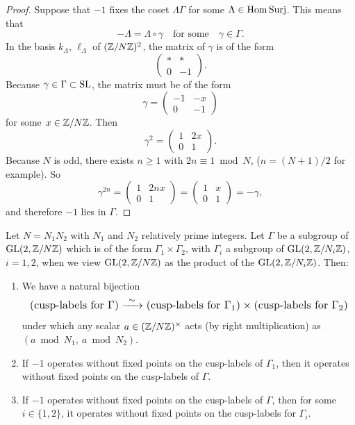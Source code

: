 \begin{proof}
Suppose that $-1$ fixes the coset $\Lambda\Gamma$ for some $\Lambda \in \mathrm{Hom\,Surj}$. This means that
\[
-\Lambda = \Lambda \circ \gamma \quad\text{for some}\quad \gamma \in \Gamma .
\]
In the basis $k_\Lambda$, $\ell_\Lambda$ of $(\mathbb{Z}/N\mathbb{Z})^2$, the matrix of $\gamma$ is of the form
\[
\begin{pmatrix} * & * \\ 0 & -1 \end{pmatrix} .
\]
Because $\gamma \in \Gamma \subset \operatorname{SL}$, the matrix must be of the form
\[
\gamma = \begin{pmatrix} -1 & -x \\ 0 & -1 \end{pmatrix}
\]
for some $x \in \mathbb{Z}/N\mathbb{Z}$. Then
\[
\gamma^2 = \begin{pmatrix} 1 & 2x \\ 0 & 1 \end{pmatrix} .
\]
Because $N$ is odd, there exists $n \ge 1$ with $2n \equiv 1 \bmod N$, ($n = (N+1)/2$ for example). So
\[
\gamma^{2n} = \begin{pmatrix} 1 & 2nx \\ 0 & 1 \end{pmatrix} = \begin{pmatrix} 1 & x \\ 0 & 1 \end{pmatrix} = -\gamma ,
\]
and therefore $-1$ lies in $\Gamma$.
\end{proof}

\begin{klem}\label{lem:10.7.3}
Let $N = N_1 N_2$ with $N_1$ and $N_2$ relatively prime integers. Let $\Gamma$ be a subgroup of $\operatorname{GL}(2,\mathbb{Z}/N\mathbb{Z})$ which is of the form $\Gamma_1 \times \Gamma_2$, with $\Gamma_i$ a subgroup of $\operatorname{GL}(2,\mathbb{Z}/N_i\mathbb{Z})$, $i = 1,2$, when we view $\operatorname{GL}(2,\mathbb{Z}/N\mathbb{Z})$ as the product of the $\operatorname{GL}(2,\mathbb{Z}/N_i\mathbb{Z})$. Then:
\begin{enumerate}[label=(\arabic*)]
\item We have a natural bijection
\[
\resizebox{0.95\linewidth}{!}{$\displaystyle
\text{(cusp-labels for } \Gamma) \xrightarrow{\ \sim\ } \text{(cusp-labels for } \Gamma_1) \times \text{(cusp-labels for } \Gamma_2)
$}
\]
under which any scalar $a \in (\mathbb{Z}/N\mathbb{Z})^\times$ acts (by right multiplication) as $(a \bmod N_1, \ a \bmod N_2)$.
\item If $-1$ operates without fixed points on the cusp-labels of $\Gamma_1$, then it operates without fixed points on the cusp-labels of $\Gamma$.
\item If $-1$ operates without fixed points on the cusp-labels of $\Gamma$, then for some $i \in \{1,2\}$, it operates without fixed points on the cusp-labels for $\Gamma_i$.
\end{enumerate}
\end{klem}

